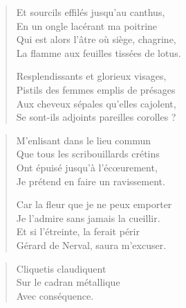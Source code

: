 \begin{textblock*}{8cm}
\begin{verse}
  Et sourcils effilés jusqu’au canthus,\\  %
  En un ongle lacérant ma poitrine\\  %
  Qui est alors l’âtre où siège, chagrine,\\  %
  La flamme aux feuilles tissées de lotus.

  Resplendissants et glorieux visages,\\  %
  Pistils des femmes emplis de présages\\  %
  Aux cheveux sépales qu’elles cajolent,\\  %
  Se sont-ils adjoints pareilles corolles ?
\end{verse}
\end{textblock*}



\begin{verse}\quatrain
  M’enlisant dans le lieu commun\\  %
  Que tous les scribouillards crétins\\  %
  Ont épuisé jusqu’à l’écœurement,\\  %
  Je prétend en faire un ravissement.  %

  Car la fleur que je ne peux emporter\\  %
  Je l’admire  sans jamais la cueillir.\\  %
  Et si l’étreinte,  la ferait périr\\  %
  Gérard de Nerval, saura m’excuser.  %
\end{verse}


\begin{verse}\haiku
  Cliquetis claudiquent\\  %
  Sur le cadran métallique\\  %
  Avec conséquence.
\end{verse}

